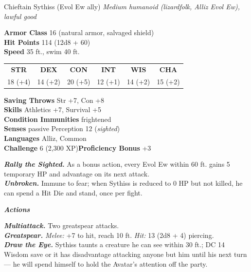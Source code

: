 \documentclass[10pt,twoside]{article}
\newcommand{\abilities}[6]{%
\begin{center}\small
\setlength{\tabcolsep}{6pt}\renewcommand{\arraystretch}{1.05}
\begin{tabular}{cccccc}
\textbf{STR}&\textbf{DEX}&\textbf{CON}&\textbf{INT}&\textbf{WIS}&\textbf{CHA}\\[1pt]
#1&#2&#3&#4&#5&#6\\
\end{tabular}\end{center}}
\newcommand{\sbrule}{\par\vspace{2pt}\noindent{\color{bloodred}\rule{\linewidth}{1.1pt}}\par\vspace{2pt}}
\begin{document}
\begin{statblock}{Chieftain Sythiss \textnormal{(Evol Ew ally)}}
\textit{Medium humanoid (lizardfolk, Alliz Evol Ew), lawful good}\sbrule
\textbf{Armor Class} 16 (natural armor, salvaged shield)\\
\textbf{Hit Points} 114 (12d8 + 60)\\
\textbf{Speed} 35 ft., swim 40 ft.\sbrule
\abilities{18 (+4)}{14 (+2)}{20 (+5)}{12 (+1)}{14 (+2)}{15 (+2)}
\sbrule
\textbf{Saving Throws} Str +7, Con +8\\
\textbf{Skills} Athletics +7, Survival +5\\
\textbf{Condition Immunities} frightened\\
\textbf{Senses} passive Perception 12 (\emph{sighted})\\
\textbf{Languages} Alliz, Common\\
\textbf{Challenge} 6 (2,300 XP)\hfill\textbf{Proficiency Bonus} +3\sbrule
\textbf{\textit{Rally the Sighted.}} As a bonus action, every Evol Ew within 60 ft.
gains 5 temporary HP and advantage on its next attack.\\
\textbf{\textit{Unbroken.}} Immune to fear; when Sythiss is reduced to 0 HP but not
killed, he can spend a Hit Die and stand, once per fight.\sbrule
\textit{\textbf{Actions}}\par
\textbf{\textit{Multiattack.}} Two greatspear attacks.\\
\textbf{\textit{Greatspear.}} \textit{Melee:} +7 to hit, reach 10 ft. \textit{Hit:} 13
(2d8 + 4) piercing.\\
\textbf{\textit{Draw the Eye.}} Sythiss taunts a creature he can see within 30 ft.; DC
14 Wisdom save or it has disadvantage attacking anyone but him until his next turn ---
he will spend himself to hold the Avatar's attention off the party.
\end{statblock}
\end{document}

